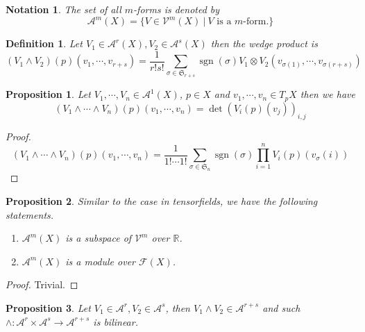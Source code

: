 \documentclass{article}
\newtheorem{proposition}{Proposition}[section]
\newtheorem{definition}{Definition}[section]
\newtheorem{notation}{Notation}[section]
\numberwithin{equation}{section}
\DeclareMathOperator{\sgn}{sgn}
\begin{document}
\begin{notation}
The set of all $m$-forms is denoted by
\begin{equation*}
\mathcal{A}^m(X)=\{V\in\mathcal{V}^m(X)\:|\: V \text{ is a $m$-form.}\}
\end{equation*}
\end{notation}

\begin{definition}
Let $V_1\in\mathcal{A}^r(X),V_2\in\mathcal{A}^s(X)$ then the wedge product is 
\begin{equation*}
(V_1\wedge V_2)(p)(v_1,\cdots,v_{r+s}) = {\frac 1 {r!s!}}\sum_{\sigma\in\mathfrak{S}_{r+s}}\sgn(\sigma)V_1\otimes V_2(v_{\sigma(1)},\cdots,v_{\sigma(r+s)})
\end{equation*}
\end{definition}

\begin{proposition}
\label{sec:det_wedge}
Let $V_1,\cdots,V_n\in\mathcal{A}^1(X)$, $p\in X$ and $v_1,\cdots,v_n\in T_pX$ then we have
\begin{equation*}
(V_1\wedge\cdots\wedge V_n)(p)(v_1,\cdots,v_n) = \det(V_i(p)(v_j))_{i,j}
\end{equation*}
\end{proposition}

\begin{proof}
\begin{equation*}
(V_1\wedge\cdots\wedge V_n)(p)(v_1,\cdots,v_{n}) = {\frac 1 {1!\cdots 1!}}\sum_{\sigma\in\mathfrak{S}_{n}}\sgn(\sigma)\prod_{i=1}^nV_i(p)(v_\sigma(i))
\end{equation*}
\end{proof}

\begin{proposition}Similar to the case in tensorfields, we have the following statements.
\begin{enumerate}
\item $\mathcal{A}^m(X)$ is a subspace of $\mathcal{V}^m$ over $\mathbb{R}$.
\item $\mathcal{A}^m(X)$ is a module over $\mathcal{F}(X)$. 
\end{enumerate}
\end{proposition}

\begin{proof}
Trivial.
\end{proof}

\begin{proposition}
Let $V_1\in\mathcal{A}^r,V_2\in\mathcal{A}^s$, then $V_1\wedge V_2\in\mathcal{A}^{r+s}$ and such $\wedge:\mathcal{A}^r\times\mathcal{A}^s\to\mathcal{A}^{r+s}$ is bilinear.
\end{proposition}
\end{document}
